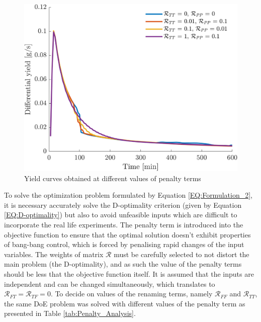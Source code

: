 \documentclass[a4paper,fleqn]{cas-dc}
\begin{document}
\begin{figure}[!ht]
	\centering
	\includegraphics[trim = 0.0cm 0.0cm 0.0cm 0.0cm,clip,width=0.9\columnwidth]{Figures/Results/Y_diff_Penalty_Analysis.png}
	\caption{Yield curves obtained at different values of penalty terms}
	\label{fig:Penalty_Analysis_Y_diff}
\end{figure}

To solve the optimization problem formulated by Equation \ref{EQ:Formulation_2}, it is necessary accurately solve the D-optimality criterion (given by Equation \ref{EQ:D-optimality}) but also to avoid unfeasible inputs which are difficult to incorporate the real life experiments. The penalty term is introduced into the objective function to ensure that the optimal solution doesn't exhibit properties of bang-bang control, which is forced by penalising rapid changes of the input variables. The weights of matrix $\mathcal{R}$ must be carefully selected to not distort the main problem (the D-optimality), and as such the value of the penalty terms should be less that the objective function itself. It is assumed that the inputs are independent and can be changed simultaneously, which translates to $\mathcal{R}_{FT}=\mathcal{R}_{TF}=0$. To decide on values of the renaming terms, namely $\mathcal{R}_{FF}$ and $\mathcal{R}_{TT}$, the same DoE problem was solved with different values of the penalty term as presented in Table \ref{tab:Penalty_Analysis}.

\begin{table}[h!]
	\centering
	\caption{Simulation cases for impact assessment of $\mathcal{R}$}
	\label{tab:Penalty_Analysis}
\end{table}
\end{document}
